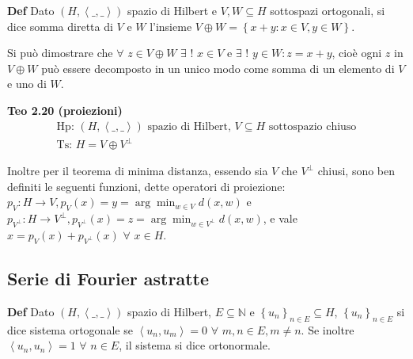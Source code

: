 \documentclass{article}
\begin{document}
\textbf{Def} Dato $\left( H,\left\langle \_,\_\right\rangle \right) $ spazio
di Hilbert e $V,W\subseteq H$ sottospazi ortogonali, si dice somma diretta
di $V$ e $W$ l'insieme $V\oplus W=\left\{ x+y:x\in V,y\in W\right\} $.

Si pu\`{o} dimostrare che $\forall $ $z\in V\oplus W$ $\exists $ $!$ $x\in V$
e $\exists $ $!$ $y\in W:z=x+y$, cio\`{e} ogni $z$ in $V\oplus W$ pu\`{o}
essere decomposto in un unico modo come somma di un elemento di $V$ e uno di 
$W$.

\textbf{Teo 2.20 (proiezioni) }%
\begin{gather*}
\text{Hp: }\left( H,\left\langle \_,\_\right\rangle \right) \text{ spazio di
Hilbert, }V\subseteq H\text{ sottospazio chiuso} \\
\text{Ts: }H=V\oplus V^{\perp }
\end{gather*}

Inoltre per il teorema di minima distanza, essendo sia $V$ che $V^{\perp }$
chiusi, sono ben definiti le seguenti funzioni, dette operatori di
proiezione: $p_{V}:H\rightarrow V,p_{V}\left( x\right) =y=\arg \min_{w\in
V}d\left( x,w\right) $ e $p_{V^{\perp }}:H\rightarrow V^{\perp },p_{V^{\perp
}}\left( x\right) =z=\arg \min_{w\in V^{\perp }}d\left( x,w\right) $, e vale 
$x=p_{V}\left( x\right) +p_{V^{\perp }}\left( x\right) $ $\forall $ $x\in H$.

\subsection{Serie di Fourier astratte}

\textbf{Def} Dato $\left( H,\left\langle \_,\_\right\rangle \right) $ spazio
di Hilbert, $E\subseteq 
\mathbb{N}
$ e $\left\{ u_{n}\right\} _{n\in E}\subseteq H$, $\left\{ u_{n}\right\}
_{n\in E}$ si dice sistema ortogonale se $\left\langle
u_{n},u_{m}\right\rangle =0$ $\forall $ $m,n\in E,m\neq n$. Se inoltre $%
\left\langle u_{n},u_{n}\right\rangle =1$ $\forall $ $n\in E$, il sistema si
dice ortonormale.
\end{document}
